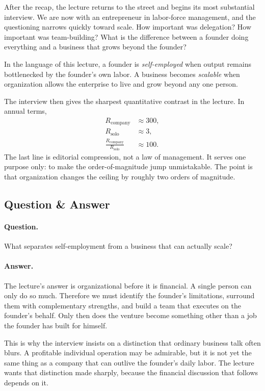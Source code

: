 After the recap, the lecture returns to the street and begins its most substantial interview. We are now with an entrepreneur in labor-force management, and the questioning narrows quickly toward scale. How important was delegation? How important was team-building? What is the difference between a founder doing everything and a business that grows beyond the founder?

\begin{definition}
In the language of this lecture, a founder is \emph{self-employed} when output remains bottlenecked by the founder's own labor. A business becomes \emph{scalable} when organization allows the enterprise to live and grow beyond any one person.
\end{definition}

The interview then gives the sharpest quantitative contrast in the lecture. In annual terms,
\begin{align}
R_{\text{company}} &\approx 300,\\
R_{\text{solo}} &\approx 3,\\
\frac{R_{\text{company}}}{R_{\text{solo}}} &\approx 100.
\end{align}
The last line is editorial compression, not a law of management. It serves one purpose only: to make the order-of-magnitude jump unmistakable. The point is that organization changes the ceiling by roughly two orders of magnitude.

\subsection{Question \& Answer}

\paragraph{Question.} What separates self-employment from a business that can actually scale?

\paragraph{Answer.} The lecture's answer is organizational before it is financial. A single person can only do so much. Therefore we must identify the founder's limitations, surround them with complementary strengths, and build a team that executes on the founder's behalf. Only then does the venture become something other than a job the founder has built for himself.

This is why the interview insists on a distinction that ordinary business talk often blurs. A profitable individual operation may be admirable, but it is not yet the same thing as a company that can outlive the founder's daily labor. The lecture wants that distinction made sharply, because the financial discussion that follows depends on it.

